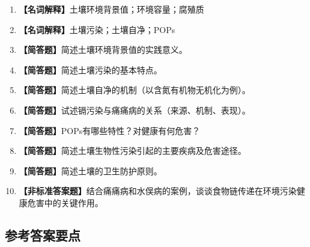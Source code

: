 \documentclass[10pt,a4paper,oneside]{ctexbook}
\begin{document}
\begin{enumerate}[leftmargin=*, itemsep=8pt]
    \item \textbf{【名词解释】}土壤环境背景值；环境容量；腐殖质
    \item \textbf{【名词解释】}土壤污染；土壤自净；POPs
    \item \textbf{【简答题】}简述土壤环境背景值的实践意义。
    \item \textbf{【简答题】}简述土壤污染的基本特点。
    \item \textbf{【简答题】}简述土壤自净的机制（以含氮有机物无机化为例）。
    \item \textbf{【简答题】}试述镉污染与痛痛病的关系（来源、机制、表现）。
    \item \textbf{【简答题】}POPs有哪些特性？对健康有何危害？
    \item \textbf{【简答题】}简述土壤生物性污染引起的主要疾病及危害途径。
    \item \textbf{【简答题】}简述土壤的卫生防护原则。
    \item \textbf{【非标准答案题】}结合痛痛病和水俣病的案例，谈谈食物链传递在环境污染健康危害中的关键作用。
\end{enumerate}

\subsection*{参考答案要点}
\end{document}
